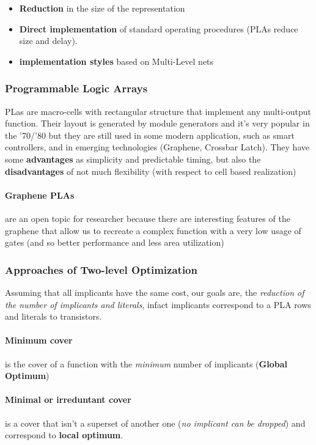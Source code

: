 \begin{itemize}
	\item \textbf{Reduction} in the size of the representation
	\item \textbf{Direct implementation} of standard operating procedures (PLAs reduce size and delay).
	\item \textbf{implementation styles} based on Multi-Level nets
\end{itemize}

\subsubsection{Programmable Logic Arrays}
PLas are macro-cells with rectangular structure that implement any multi-output function. Their layout is generated by module generators and it's very popular in the '70/'80 but they are still used in some modern application, such as smart controllers, and in emerging technologies (Graphene, Crossbar Latch). They have some \textbf{advantages} as simplicity and predictable timing, but also the \textbf{disadvantages} of not much flexibility (with respect to cell based realization)
\paragraph{Graphene PLAs} are an open topic for researcher because there are interesting features of the graphene that allow us to recreate a complex function with a very low usage of gates (and so better performance and less area utilization)

\subsubsection{Approaches of Two-level Optimization}
Assuming that all implicants have the same cost, our goals are, the \textit{reduction of the number of implicants and literals}, infact implicants correspond to a PLA rows and literals to transistors.

\paragraph{Minimum cover} is the cover of a function with the \textit{minimum} number of implicants (\textbf{Global Optimum})

\paragraph{Minimal or irreduntant cover} is a cover that isn't a superset of another one (\textit{no implicant can be dropped}) and correspond to \textbf{local optimum}.

